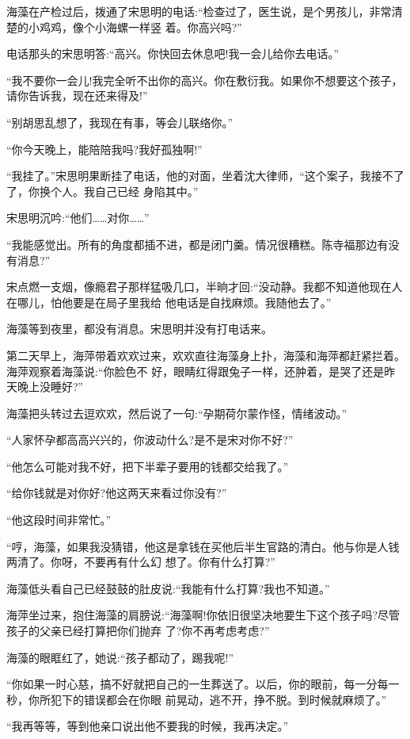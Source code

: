 \documentclass[11pt,a4paper,onecolumn]{article}
\begin{document}
海藻在产检过后，拨通了宋思明的电话:``检查过了，医生说，是个男孩儿，非常清楚的小鸡鸡，像个小海螺一样竖
着。你高兴吗?''

电话那头的宋思明答:``高兴。你快回去休息吧!我一会儿给你去电话。''

``我不要你一会儿!我完全听不出你的高兴。你在敷衍我。如果你不想要这个孩子，请你告诉我，现在还来得及!''

``别胡思乱想了，我现在有事，等会儿联络你。''

``你今天晚上，能陪陪我吗?我好孤独啊!''

``我挂了。''宋思明果断挂了电话，他的对面，坐着沈大律师，``这个案子，我接不了了，你换个人。我自己已经
身陷其中。''

宋思明沉吟:``他们……对你……''

``我能感觉出。所有的角度都插不进，都是闭门羹。情况很糟糕。陈寺福那边有没有消息?''

宋点燃一支烟，像瘾君子那样猛吸几口，半晌才回:``没动静。我都不知道他现在人在哪儿，怕他要是在局子里我给
他电话是自找麻烦。我随他去了。''

海藻等到夜里，都没有消息。宋思明并没有打电话来。

第二天早上，海萍带着欢欢过来，欢欢直往海藻身上扑，海藻和海萍都赶紧拦着。海萍观察着海藻说:``你脸色不
好，眼睛红得跟兔子一样，还肿着，是哭了还是昨天晚上没睡好?''

海藻把头转过去逗欢欢，然后说了一句:``孕期荷尔蒙作怪，情绪波动。''

``人家怀孕都高高兴兴的，你波动什么?是不是宋对你不好?''

``他怎么可能对我不好，把下半辈子要用的钱都交给我了。''

``给你钱就是对你好?他这两天来看过你没有?''

``他这段时间非常忙。''

``哼，海藻，如果我没猜错，他这是拿钱在买他后半生官路的清白。他与你是人钱两清了。你呀，不要再有什么幻
想了。你有什么打算?''

海藻低头看自己已经鼓鼓的肚皮说:``我能有什么打算?我也不知道。''

海萍坐过来，抱住海藻的肩膀说:``海藻啊!你依旧很坚决地要生下这个孩子吗?尽管孩子的父亲已经打算把你们抛弃
了?你不再考虑考虑?''

海藻的眼眶红了，她说:``孩子都动了，踢我呢!''

``你如果一时心慈，搞不好就把自己的一生葬送了。以后，你的眼前，每一分每一秒，你所犯下的错误都会在你眼
前晃动，逃不开，挣不脱。到时候就麻烦了。''

``我再等等，等到他亲口说出他不要我的时候，我再决定。''
\end{document}
